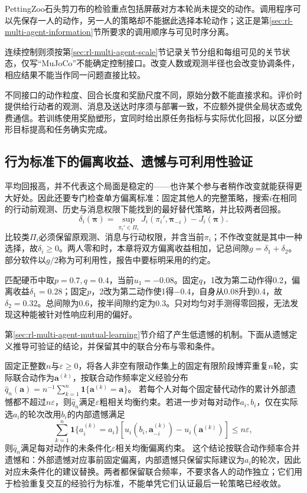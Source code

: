 PettingZoo石头剪刀布的检验重点包括屏蔽对方本轮尚未提交的动作。调用程序可以先保存一人的动作，另一人的策略却不能据此选择本轮动作；这正是第\ref{sec:rl-multi-agent-information}节所要求的调用顺序与可见时序分离。

连续控制则须按第\ref{sec:rl-multi-agent-scale}节记录关节分组和每组可见的关节状态，仅写“MuJoCo”不能确定控制接口。改变人数或观测半径也会改变协调条件，相应结果不能当作同一问题直接比较。

不同接口的动作粒度、回合长度和奖励尺度不同，原始分数不能直接求和。评价时提供给行动者的观测、消息及送达时序须与部署一致，不应额外提供全局状态或免费通信。若训练使用奖励塑形，宜同时给出原任务指标与实际优化回报，以区分塑形目标提高和任务确实完成。

\subsection{行为标准下的偏离收益、遗憾与可利用性验证}
\label{sec:rl-multi-agent-deviations}

平均回报高，并不代表这个局面是稳定的——也许某个参与者稍作改变就能获得更大好处。因此还要专门检查单方偏离标准：固定其他人的完整策略，搜索$i$在相同的行动前观测、历史与消息权限下能找到的最好替代策略，并比较两者回报。
\[
 \delta_i(\bm\pi)=
 \sup_{\pi_i'\in\Pi_i}J_i(\pi_i',\bm\pi_{-i})-J_i(\bm\pi).
\]
比较类$\Pi_i$必须保留原观测、消息与行动权限，并含当前$\pi_i$；不作改变就是其中一种选择，故$\delta_i\geq0$。两人零和时，本章将双方偏离收益相加，记总间隙$g=\delta_1+\delta_2$。部分软件以$g/2$称为可利用性，报告中要标明采用的约定。

匹配硬币中取$p=0.7,q=0.4$，当前$u_1=-0.08$。固定$q$，1改为第二动作得0.2，偏离收益$\delta_1=0.28$；固定$p$，2改为第二动作使1得$-0.4$，自身从0.08升到0.4，故$\delta_2=0.32$。总间隙为0.6，按半间隙约定为0.3。只对均匀对手测得零回报，无法发现这种能被针对性响应利用的偏好。

第\ref{sec:rl-multi-agent-mutual-learning}节介绍了产生低遗憾的机制。下面从遗憾定义推导可验证的结论，并保留其中的联合分布与零和条件。

固定正整数$n$与$\varepsilon\geq0$，将各人非空有限动作集上的固定有限阶段博弈重复$n$轮，实际联合动作为$\bm a^{(k)}$，按联合动作频率定义经验分布
$\hat q_n(\bm a)=n^{-1}\sum_{k=1}^n\mathbf1\{\bm a^{(k)}=\bm a\}$。
若每个人对每个固定替代动作的累计外部遗憾都不超过$n\varepsilon$，则$\hat q_n$满足$\varepsilon$粗相关均衡约束。若进一步对每对动作$a_i,b_i$，仅在实际选$a_i$的轮次改用$b_i$的内部遗憾满足
\[
 \sum_{k=1}^n\mathbf1\{a_i^{(k)}=a_i\}
 [u_i(b_i,\bm a_{-i}^{(k)})-u_i(\bm a^{(k)})]
 \leq n\varepsilon,
\]
则$\hat q_n$满足每对动作的未条件化$\varepsilon$相关均衡偏离约束。
这个结论按联合动作频率合并遗憾和：外部遗憾对应事前固定偏离，内部遗憾只保留实际建议为$a_i$的轮次，因此对应未条件化的建议替换。两者都保留联合频率，不要求各人的动作独立；它们用于检验重复交互的经验行为标准，不能单凭它们认证最后一轮策略已经收敛。

